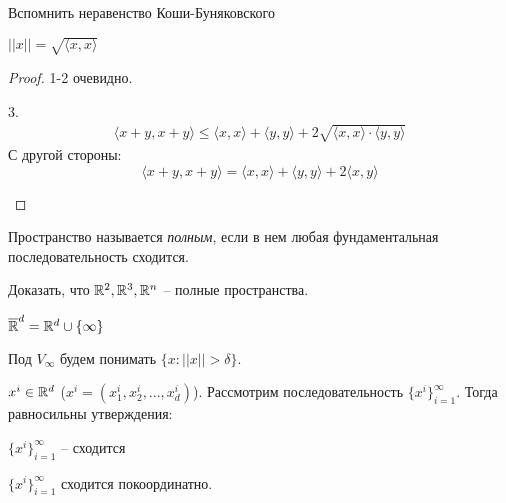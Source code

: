     \begin{Ex}
        Вспомнить неравенство Коши-Буняковского
    \end{Ex}

    \begin{Prop}
        $||x|| = \sqrt{\langle x, x\rangle}$
    \end{Prop}

    \begin{proof}
        1-2 очевидно.
        \begin{MyList}
            \item[3.]
            \begin{align*}
                \langle x + y, x + y \rangle \leqslant \langle x, x\rangle + \langle y, y\rangle + 2\sqrt{\langle x, x\rangle \cdot \langle y, y\rangle}
            \end{align*}
            С другой стороны:
            \[\langle x + y, x + y \rangle = \langle x, x\rangle + \langle y, y\rangle + 2 \langle x, y\rangle\]
        \end{MyList}
    \end{proof}

    \begin{Def}
        Пространство называется \textit{полным}, если в нем любая фундаментальная последовательность сходится.
    \end{Def}

    \begin{Ex}
        Доказать, что $\mathbb{R}^2, \mathbb{R}^3, \mathbb{R}^n$ -- полные пространства.
    \end{Ex}

    \begin{notation}
        $\overline{\mathbb{R}}^d = \mathbb{R}^d \cup \{\infty\}$ 
    \end{notation}

    \begin{Rem}
        Под $V_\infty$ будем понимать $\{x : ||x|| > \delta\}$. 
    \end{Rem}    
    
    \begin{Thm}
        $x^i \in \mathbb{R}^d$ ($x^i = (x_1^i, x_2^i, ..., x_d^i)$). Рассмотрим последовательность $\{x^i\}_{i = 1}^\infty$. Тогда 
        равносильны утверждения: 

        \begin{MyList}
            \item $\{x^i\}_{i = 1}^\infty$ -- сходится
            \item $\{x^i\}_{i = 1}^\infty$ сходится покоординатно.  
        \end{MyList}
    \end{Thm}

